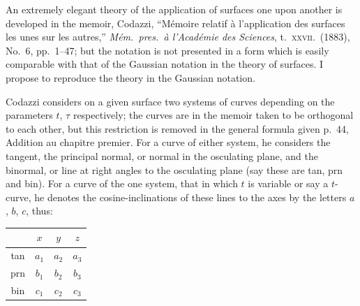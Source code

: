 \documentclass[11pt,a4paper]{article}
\begin{document}
An extremely elegant theory of the application of surfaces one upon another is developed in the memoir, Codazzi, ``M\'emoire relatif \`a l'application des surfaces les unes sur les autres,'' \textit{M\'em.\ pres.\ \`a l'Acad\'emie des Sciences}, t.\ \textsc{xxvii}.\ (1883), No.\ 6, pp.\ 1--47; but the notation is not presented in a form which is easily comparable with that of the Gaussian notation in the theory of surfaces. I propose to reproduce the theory in the Gaussian notation.

Codazzi considers on a given surface two systems of curves depending on the parameters $t$, $\tau$ respectively; the curves are in the memoir taken to be orthogonal to each other, but this restriction is removed in the general formula given p.\ 44, Addition au chapitre premier. For a curve of either system, he considers the tangent, the principal normal, or normal in the osculating plane, and the binormal, or line at right angles to the osculating plane (say these are tan, prn and bin). For a curve of the one system, that in which $t$ is variable or say a $t$-curve, he denotes the cosine-inclinations of these lines to the axes by the letters $a$, $b$, $c$, thus:

\begin{center}
\begin{tabular}{c|ccc}
& $x$ & $y$ & $z$ \\
\hline
tan & $a_1$ & $a_2$ & $a_3$ \\
prn & $b_1$ & $b_2$ & $b_3$ \\
bin & $c_1$ & $c_2$ & $c_3$ \\
\end{tabular}
\end{center}
\end{document}
